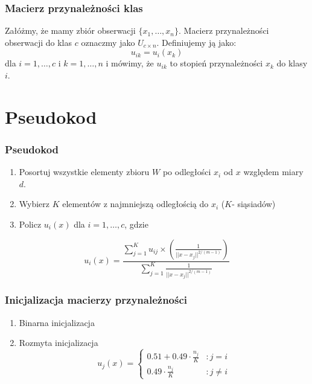 \documentclass{beamer}
\begin{document}
\begin{frame}
\frametitle{Macierz przynależności klas}
Załóżmy, że mamy zbiór obserwacji $\{x_1, \ldots, x_n\}$. Macierz przynależności obserwacji do klas $c$ oznaczmy jako $U_{c \times n}$.
Definiujemy ją jako: 
\begin{equation}
    u_{ik} = u_i(x_k)
\end{equation}    
 dla $i=1, \ldots, c$ i $k=1,\ldots,n$
 i mówimy, że $u_{ik}$ to stopień przynależności $x_k$ do klasy $i$.
\end{frame}

\section{Pseudokod}
\begin{frame}
\frametitle{Pseudokod}
	\begin{enumerate}
        \item Posortuj wszystkie elementy zbioru $W$ po odległości $x_i$ od $x$ względem miary $d$.
        \item Wybierz $K$ elementów z najmniejszą odległością do $x_i$ ($K$- siąsiadów)
        \item Policz $u_i(x)$ dla $i=1, \ldots, c$, gdzie 
	\end{enumerate}
	\vspace{2mm}
    \begin{equation}
         u_i(x) = \frac{\sum_{j=1}^{K} u_{ij} \times (\frac{1}{||x-x_j||^{2/(m-1)}})}
         {\sum_{j=1}^{K} \frac{1}{||x-x_j||^{2/(m-1)}}}   
    \end{equation}
\end{frame}	


\begin{frame}
	\frametitle{Inicjalizacja macierzy przynależności}
	\begin{enumerate}
    	\item Binarna inicjalizacja
	    \item Rozmyta inicjalizacja
	\begin{equation}
        u_j(x) = \left\{
          \begin{array}{lr}
            0.51 + 0.49 \cdot \frac{n_j}{K} & : j = i\\
            0.49 \cdot \frac{n_j}{K} & : j \neq i
          \end{array}
        \right.
	\end{equation}
	\end{enumerate}
\end{frame}	
\end{document}
